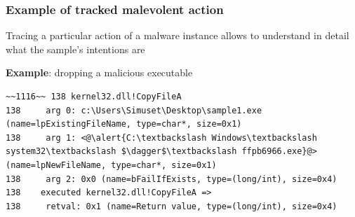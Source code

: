 \documentclass[compress]{beamer}
\begin{document}
\begin{frame}[fragile]
    \frametitle{Example of tracked malevolent action}

\begin{beamerboxesrounded}[shadow=true]{}
Tracing a particular action of a malware instance allows to understand in detail what the sample's intentions are
\end{beamerboxesrounded}
\bigskip    
\textbf{Example}: dropping a malicious executable
\vspace*{0.3cm}
    
	

\begin{lstlisting}
~~1116~~ 138 kernel32.dll!CopyFileA
138 	arg 0: c:\Users\Simuset\Desktop\sample1.exe 
(name=lpExistingFileName, type=char*, size=0x1)
138 	arg 1: <@\alert{C:\textbackslash Windows\textbackslash system32\textbackslash $\dagger$\textbackslash ffpb6966.exe}@> 
(name=lpNewFileName, type=char*, size=0x1)
138 	arg 2: 0x0 (name=bFailIfExists, type=(long/int), size=0x4)
138    executed kernel32.dll!CopyFileA =>
138 	retval: 0x1 (name=Return value, type=(long/int), size=0x4)
\end{lstlisting}

\end{frame}
\end{document}
